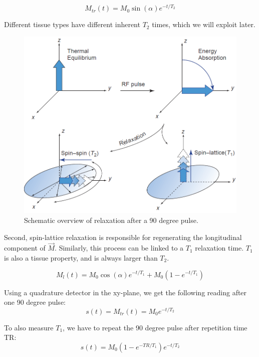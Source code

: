 \begin{equation}
M_{tr}(t) = M_0 \sin(\alpha) e^{-t/T_2}
\end{equation}

Different tissue types have different inherent $T_2$ times, which we will
exploit later.

\begin{figure}[ht]
\begin{center}
  \includegraphics[width=\linewidth]{img/relaxation.png}
  \caption{Schematic overview of relaxation after a 90 degree pulse. \cite{suetens}}
  \label{fig:relaxation}
\end{center}
\end{figure}

Second, spin-lattice relaxation is responsible for regenerating the
longitudinal component of $\vec{M}$. Similarly, this process can be linked to a
$T_1$ relaxation time. $T_1$ is also a tissue property, and is always larger
than $T_2$.

\begin{equation}
M_l(t) = M_0 \cos(\alpha) e^{-t/T_1} + M_0 (1 - e^{-t/T_1})
\end{equation}

Using a quadrature detector in the xy-plane, we get the following reading
after one 90 degree pulse:
\begin{equation}
s(t) = M_{tr}(t) = M_0 e^{-t/T_2}
\end{equation}

To also measure $T_1$, we have to repeat the 90 degree pulse after repetition
time TR:
\begin{equation}
s(t) = M_0 (1 - e^{-TR/T_1}) e^{-t/T_2}
\end{equation}

